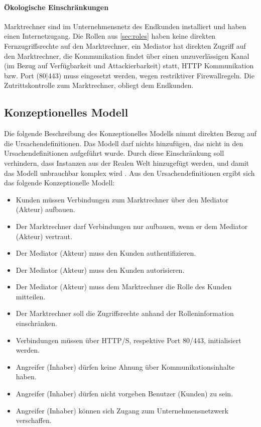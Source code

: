 \documentclass[11pt,a4paper]{report}
\begin{document}
\paragraph{Ökologische Einschränkungen} Marktrechner sind im Unternehmensnetz des Endkunden installiert und haben einen Internetzugang. Die Rollen aus \ref{sec:roles} haben keine direkten Fernzugriffsrechte auf den Marktrechner, ein Mediator hat direkten Zugriff auf den Marktrechner,  die Kommunikation findet über einen unzuverlässigen Kanal (im Bezug auf Verfügbarkeit und Attackierbarkeit) statt, HTTP Kommunikation bzw. Port (80|443) muss eingesetzt werden, wegen restriktiver Firewallregeln. Die Zutrittskontrolle zum Marktrechner, obliegt dem Endkunden.

\subsection{Konzeptionelles Modell}

Die folgende Beschreibung des Konzeptionelles Modells nimmt direkten Bezug auf die Ursachendefinitionen. Das Modell darf nichts hinzufügen, das nicht in den Ursachendefinitionen aufgeführt wurde. Durch diese Einschränkung soll verhindern, dass Instanzen aus der Realen Welt hinzugefügt werden, und damit das Modell unbrauchbar komplex wird \cite{gutmann6}. Aus den Ursachendefinitionen ergibt sich das folgende Konzeptionelle Modell:

\begin{itemize}[leftmargin=*]
\item[] Kunden müssen Verbindungen zum Marktrechner über den Mediator (Akteur) aufbauen.
\item[] Der Marktrechner darf Verbindungen nur aufbauen, wenn er dem Mediator (Akteur) vertraut.
\item[] Der Mediator (Akteur) muss den Kunden authentifizieren.
\item[] Der Mediator (Akteur) muss den Kunden autorisieren.
\item[] Der Mediator (Akteur) muss dem Marktrechner die Rolle des Kunden mitteilen.
\item[] Der Marktrechner soll die Zugriffsrechte anhand der Rolleninformation einschränken.
\item[] Verbindungen müssen über HTTP/S, respektive Port 80/443, initialisiert werden.
\item[] Angreifer (Inhaber) dürfen keine Ahnung über Kommunikationsinhalte haben.
\item[] Angreifer (Inhaber) dürfen nicht vorgeben Benutzer (Kunden) zu sein.
\item[] Angreifer (Inhaber) können sich Zugang zum Unternehmensnetzwerk verschaffen.
\end{itemize}
\end{document}

